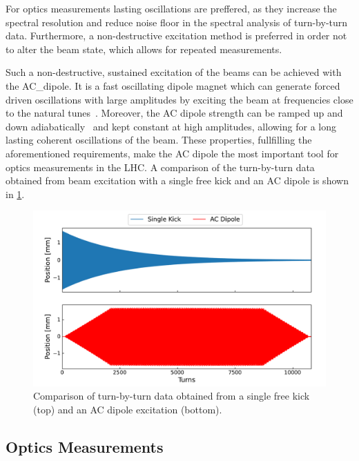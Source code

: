 For \gls{optics} measurements lasting oscillations are preffered, as they increase the spectral resolution and reduce noise floor in the spectral analysis of turn-by-turn data.
Furthermore, a non-destructive excitation method is preferred in order not to alter the beam state, which allows for repeated measurements.

Such a non-destructive, sustained excitation of the beams can be achieved with the \gls{AC_dipole}.
It is a fast oscillating dipole magnet which can generate forced driven oscillations with large amplitudes by exciting the beam at frequencies close to the natural tunes~\cite{PHD:Miyamoto,CERN:Serrano:LHC_ACDipole_Introduction}.
Moreover, the AC dipole strength can be ramped up and down adiabatically~\cite{PRAB:Tomas:Adiabaticity_Ramping_Process_AC_Dipole} and kept constant at high amplitudes, allowing for a long lasting coherent oscillations of the beam.
These properties, fullfilling the aforementioned requirements, make the AC dipole the most important tool for optics measurements in the LHC.
A comparison of the turn-by-turn data obtained from beam excitation with a single free kick and an AC dipole is shown in \cref{figure:kick_vs_acdipole_tbt}.

\begin{figure}[!htb]
  \centering
  \includegraphics*[width=\linewidth]{Figures/Optics_Measurements_Corrections_at_LHC/kick_vs_acdipole.pdf}
  \caption{Comparison of turn-by-turn data obtained from a single free kick (top) and an AC dipole excitation (bottom).}
  \label{figure:kick_vs_acdipole_tbt}
\end{figure}

\subsection{Optics Measurements}
\label{subsection:optics_measurements}

